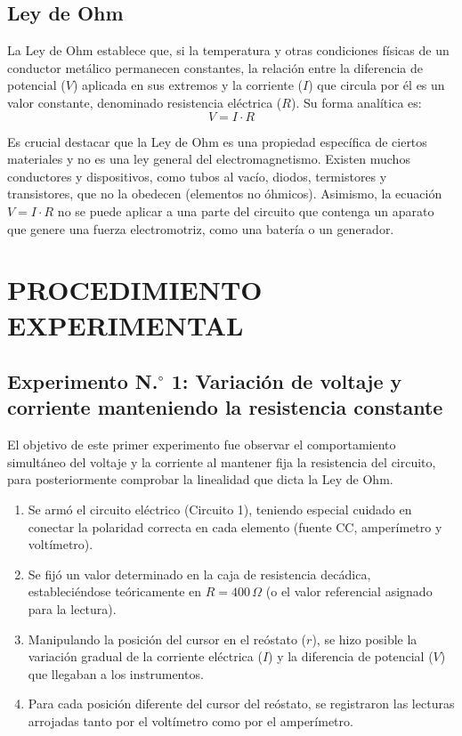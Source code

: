\documentclass[12pt,a4paper]{article}
\begin{document}
\subsection{Ley de Ohm}
La Ley de Ohm establece que, si la temperatura y otras condiciones físicas de un conductor metálico permanecen constantes, la relación entre la diferencia de potencial ($V$) aplicada en sus extremos y la corriente ($I$) que circula por él es un valor constante, denominado resistencia eléctrica ($R$). Su forma analítica es:
\begin{equation}
V = I \cdot R
\end{equation}

Es crucial destacar que la Ley de Ohm es una propiedad específica de ciertos materiales y no es una ley general del electromagnetismo. Existen muchos conductores y dispositivos, como tubos al vacío, diodos, termistores y transistores, que no la obedecen (elementos no óhmicos). Asimismo, la ecuación $V = I \cdot R$ no se puede aplicar a una parte del circuito que contenga un aparato que genere una fuerza electromotriz, como una batería o un generador.

\section{PROCEDIMIENTO EXPERIMENTAL}

\subsection{Experimento N.$^\circ$ 1: Variación de voltaje y corriente manteniendo la resistencia constante}
El objetivo de este primer experimento fue observar el comportamiento simultáneo del voltaje y la corriente al mantener fija la resistencia del circuito, para posteriormente comprobar la linealidad que dicta la Ley de Ohm.

\begin{enumerate}
    \item Se armó el circuito eléctrico (Circuito 1), teniendo especial cuidado en conectar la polaridad correcta en cada elemento (fuente CC, amperímetro y voltímetro).
    \item Se fijó un valor determinado en la caja de resistencia decádica, estableciéndose teóricamente en $R = 400\,\Omega$ (o el valor referencial asignado para la lectura).
    \item Manipulando la posición del cursor en el reóstato ($r$), se hizo posible la variación gradual de la corriente eléctrica ($I$) y la diferencia de potencial ($V$) que llegaban a los instrumentos.
    \item Para cada posición diferente del cursor del reóstato, se registraron las lecturas arrojadas tanto por el voltímetro como por el amperímetro.
\end{enumerate}
\end{document}
